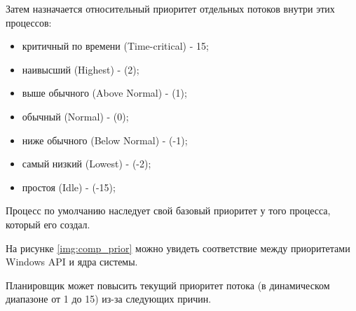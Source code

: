 Затем назначается относительный приоритет отдельных потоков внутри этих процессов:

\begin{itemize}
    \item критичный по времени (Time-critical) - 15;
    \item наивысший (Highest) - (2);
    \item выше обычного (Above Normal) - (1);
    \item обычный (Normal) - (0);
    \item ниже обычного (Below Normal) - (-1);
    \item самый низкий (Lowest) - (-2);
    \item простоя (Idle) - (-15);
\end{itemize}


Процесс по умолчанию наследует свой базовый приоритет у того процесса, который его создал.

На рисунке \ref{img:comp_prior} можно увидеть соответствие между приоритетами Windows API и ядра системы.




Планировщик может повысить текущий приоритет потока (в динамическом диапазоне от 1 до 15) из-за следующих причин.

